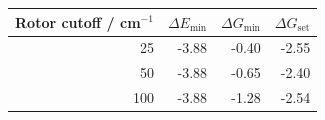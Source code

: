 \begin{tabular}{rrrr}\toprule
Rotor cutoff / cm$^{-1}$ & $\Delta E_{\min}$ & $\Delta G_{\min}$ & $\Delta G_{\mathrm{set}}$\\\midrule
25 & -3.88 & -0.40 & -2.55\\
50 & -3.88 & -0.65 & -2.40\\
100 & -3.88 & -1.28 & -2.54\\
\bottomrule\end{tabular}
